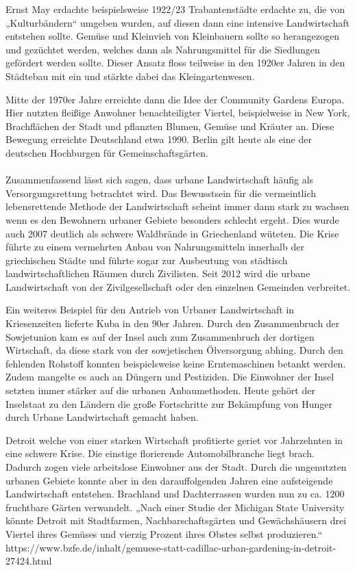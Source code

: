 \documentclass{scrartcl}
\begin{document}
Ernst May erdachte beispielsweise 1922/23 Trabantenstädte erdachte zu, die von „Kulturbändern“ umgeben wurden, auf diesen dann eine intensive Landwirtschaft entstehen sollte. Gemüse und Kleinvieh von Kleinbauern sollte so herangezogen und gezüchtet werden, welches dann als Nahrungsmittel für die Siedlungen gefördert werden sollte. Dieser Ansatz floss teilweise in den 1920er Jahren in den Städtebau mit ein und stärkte dabei das Kleingartenwesen.

Mitte der 1970er Jahre erreichte dann die Idee der Community Gardens Europa. Hier nutzten fleißige Anwohner benachteiligter Viertel, beispielweise in New York, Brachflächen der Stadt und pflanzten Blumen, Gemüse und Kräuter an. Diese Bewegung erreichte Deutschland etwa 1990. Berlin gilt heute als eine der deutschen Hochburgen für Gemeinschaftsgärten.\\
\\
Zusammenfassend lässt sich sagen, dass urbane Landwirtschaft häufig als Versorgungsrettung betrachtet wird. Das Bewusstsein für die vermeintlich lebensrettende Methode der Landwirtschaft scheint immer dann stark zu wachsen wenn es den Bewohnern urbaner Gebiete besonders schlecht ergeht. Dies wurde auch 2007 deutlich als schwere Waldbrände in Griechenland wüteten. Die Krise führte zu einem vermehrten Anbau von Nahrungsmitteln innerhalb der griechischen Städte und führte sogar zur Ausbeutung von städtisch landwirtschaftlichen Räumen durch Zivilisten. Seit 2012 wird die urbane Landwirtschaft von der Zivilgesellschaft oder den einzelnen Gemeinden verbreitet.

Ein weiteres Beispiel für den Antrieb von Urbaner Landwirtschaft in Kriesenzeiten lieferte Kuba in den 90er Jahren. Durch den Zusammenbruch der Sowjetunion kam es auf der Insel auch zum Zusammenbruch der dortigen Wirtschaft, da diese stark von der sowjetischen Ölversorgung abhing. Durch den fehlenden Rohstoff konnten beispielsweise keine Erntemaschinen betankt werden. Zudem mangelte es auch an Düngern und Pestiziden. Die Einwohner der Insel setzten immer stärker auf die urbanen Anbaumethoden. Heute gehört der Inselstaat zu den Ländern die große Fortschritte zur Bekämpfung von Hunger durch Urbane Landwirtschaft gemacht haben.

Detroit welche von einer starken Wirtschaft profitierte geriet vor Jahrzehnten in eine schwere Krise. Die einstige florierende Automobilbranche liegt brach. Dadurch zogen viele arbeitslose Einwohner aus der Stadt. Durch die ungenutzten urbanen Gebiete konnte aber in den darauffolgenden Jahren eine aufsteigende Landwirtschaft entstehen. Brachland und Dachterrassen wurden nun zu ca. 1200 fruchtbare Gärten verwandelt. „Nach einer Studie der Michigan State University könnte Detroit mit Stadtfarmen, Nachbarschaftsgärten und Gewächshäusern drei Viertel ihres Gemüses und vierzig Prozent ihres Obstes selbst produzieren.“ https://www.bzfe.de/inhalt/gemuese-statt-cadillac-urban-gardening-in-detroit-27424.html
\end{document}
